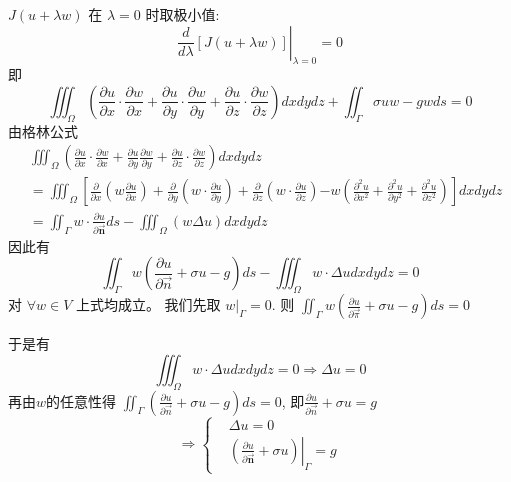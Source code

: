 \begin{questions}
\begin{solution}
 $J(u+\lambda w) $ 在 $ \lambda=0 $ 时取极小值: $$ \left.\frac{d}{d \lambda}[J(u+\lambda w)]\right|_{\lambda=0}=0 $$
即 $$ \iiint_{\Omega}\left(\frac{\partial u}{\partial x} \cdot \frac{\partial w}{\partial x}+\frac{\partial u}{\partial y} \cdot \frac{\partial w}{\partial y}+\frac{\partial u}{\partial z} \cdot \frac{\partial w}{\partial z}\right) d x d y d z+\iint_{\Gamma} \sigma u w-g w d s=0 $$ 
由格林公式 
$$\begin{aligned} &\iiint_{\Omega}\left(\frac{\partial u}{\partial x} \cdot \frac{\partial w}{\partial x}+\frac{\partial u}{\partial y} \frac{\partial w}{\partial y}+\frac{\partial u}{\partial z} \cdot \frac{\partial w}{\partial z}\right) d x d y d z \\
&=\iiint_{\Omega}\left[\frac{\partial}{\partial x}\left(w \frac{\partial u}{\partial x}\right)+\frac{\partial}{\partial y}\left(w \cdot \frac{\partial u}{\partial y}\right)+\frac{\partial}{\partial z}\left(w \cdot \frac{\partial u}{\partial z}\right)\right. \left.-w\left(\frac{\partial^{2} u}{\partial x^{2}}+\frac{\partial^{2} u}{\partial y^{2}}+\frac{\partial^{2} u}{\partial z^{2}}\right)\right] d x d y d z \\
&=\iint_{\Gamma} w \cdot \frac{\partial u}{\partial \vec{\boldsymbol n}} d s-\iiint_{\Omega}(w \Delta u) d x d y d z
\end{aligned}
$$
因此有 $$ \iint_{\Gamma } w\left(\frac{\partial u}{\partial \vec{n}}+\sigma u-g\right) d s-\iiint_{\Omega} w \cdot \Delta u d x d y d z=0 $$ 
对 $ \forall w \in V $ 上式均成立。
我们先取 $ \left.w\right|_{\Gamma }=0 $. 则 $ \iint_{\Gamma} w\left(\frac{\partial u}{\partial \vec{\pi}}+\sigma u-g\right) d s=0 $

于是有 $$ \iiint_{\Omega} w \cdot \Delta u d x d y d z=0 \Rightarrow \Delta u=0
$$
再由$w$的任意性得 $ \iint_{\Gamma}\left(\frac{\partial u}{\partial \vec{n}}+\sigma u-g\right) d s=0 $, 即$\frac{\partial u}{\partial \vec{n}}+\sigma u=g$
$$
\Rightarrow\left\{\begin{aligned}
&\Delta u=0 \\
&\left.\left(\frac{\partial u}{\partial \vec{\boldsymbol{n}}}+\sigma u\right)\right|_{\Gamma}=g
\end{aligned}\right.
$$




\end{solution}
\end{questions}

